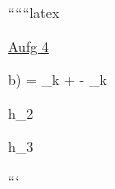 
``````latex

\underline{Aufg 4}

b)  = _k \left[ h_2 - h_3 \right] +  - _k

\quad h_2 \left[ x = 0 \right]

\quad h_3 

```